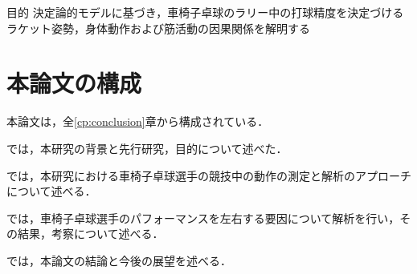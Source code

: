\documentclass[../main]{subfiles}
\begin{document}
\bigskip
\begin{itembox}[c]{目的}
  \centering
決定論的モデルに基づき，車椅子卓球のラリー中の打球精度を決定づける\\ラケット姿勢，身体動作および筋活動の因果関係を解明する
\end{itembox}


\clearpage

\section{本論文の構成}
\label{sec:configuration}

本論文は，全\ref{cp:conclusion}章から構成されている．

では，本研究の背景と先行研究，目的について述べた．

では，本研究における車椅子卓球選手の競技中の動作の測定と解析のアプローチについて述べる．

では，車椅子卓球選手のパフォーマンスを左右する要因について解析を行い，その結果，考察について述べる．

では，本論文の結論と今後の展望を述べる．


\clearpage
\end{document}
